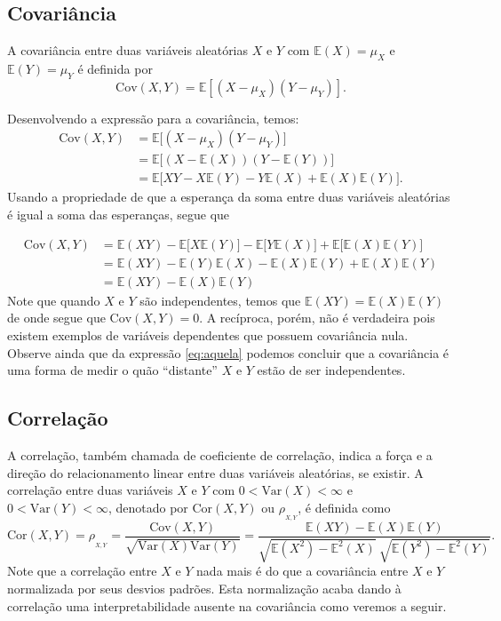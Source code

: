 \documentclass[
]{book}
\theoremstyle{definition}
\theoremstyle{definition}
\theoremstyle{definition}
\theoremstyle{remark}
\begin{document}
\hypertarget{covariuxe2ncia}{%
\subsection{Covariância}\label{covariuxe2ncia}}

A covariância entre duas variáveis aleatórias \(X\) e \(Y\) com \({\mathbb{E}}(X)=\mu_{X}\) e
\({\mathbb{E}}(Y)=\mu_{Y}\) é definida por
\[\mbox{Cov}(X, Y) = {\mathbb{E}}[(X - \mu_{X}) (Y - \mu_{Y})].\]

Desenvolvendo a expressão para a covariância, temos:
\begin{align*}
\mbox{Cov}(X, Y) &= {\mathbb{E}}\big[(X - \mu_{X}) (Y - \mu_{Y})\big]\\
&={\mathbb{E}}\big[(X - \mathbb{E}(X)) (Y - {\mathbb{E}}(Y))\big]\\
&={\mathbb{E}}\big[XY - X{\mathbb{E}}(Y) - Y{\mathbb{E}}(X) + {\mathbb{E}}(X){\mathbb{E}}(Y)\big].
\end{align*}
Usando a propriedade de que a esperança da soma entre duas variáveis aleatórias é igual a soma das esperanças, segue que

\begin{align}
\mbox{Cov}(X, Y) &= {\mathbb{E}}(XY) - {\mathbb{E}}\big[X{\mathbb{E}}(Y)\big] - {\mathbb{E}}\big[Y{\mathbb{E}}(X)\big] +  {\mathbb{E}}\big[{\mathbb{E}}(X){\mathbb{E}}(Y)\big]\nonumber\\
&= {\mathbb{E}}(XY) - {\mathbb{E}}(Y){\mathbb{E}}(X) - {\mathbb{E}}(X){\mathbb{E}}(Y) + {\mathbb{E}}(X){\mathbb{E}}(Y)\nonumber\\
&=\mathbb{E}(X Y) - \mathbb{E}(X) \mathbb{E}(Y)
\label{eq:aquela}
\end{align}
Note que quando \(X\) e \(Y\) são independentes, temos que \(\mathbb{E}(XY)=\mathbb{E}(X)\mathbb{E}(Y)\) de onde segue que \(\mbox{Cov}(X,Y)=0\). A recíproca, porém, não é verdadeira pois existem exemplos de variáveis dependentes que possuem covariância nula. Observe ainda que da expressão \eqref{eq:aquela} podemos concluir que a covariância é uma forma de medir o quão ``distante'' \(X\) e \(Y\) estão de ser independentes.

\hypertarget{correlauxe7uxe3o}{%
\subsection{Correlação}\label{correlauxe7uxe3o}}

A correlação, também chamada de coeficiente de correlação, indica a força e a direção do relacionamento linear entre duas variáveis aleatórias, se existir. A correlação entre duas variáveis \(X\) e \(Y\) com \(0<\mbox{Var}(X)<\infty\) e \(0<\mbox{Var}(Y)<\infty\), denotado por \(\mbox{Cor}(X,Y)\) ou \(\rho_{_{X,Y}}\), é definida como
\[\mbox{Cor}(X,Y)=\rho_{_{X,Y}}=\frac{\mbox{Cov}(X,Y)}{  \sqrt{\mbox{Var}(X)\mbox{Var}(Y)}}=\frac{\mathbb{E}(XY)-\mathbb{E}(X)\mathbb{E}(Y)}{\sqrt{\mathbb{E}(X^2)-\mathbb{E}^2(X)}~\sqrt{\mathbb{E}(Y^2)-\mathbb{E}^2(Y)}}.\]
Note que a correlação entre \(X\) e \(Y\) nada mais é do que a covariância entre \(X\) e \(Y\) normalizada por seus desvios padrões. Esta normalização acaba dando à correlação uma interpretabilidade ausente na covariância como veremos a seguir.
\end{document}
